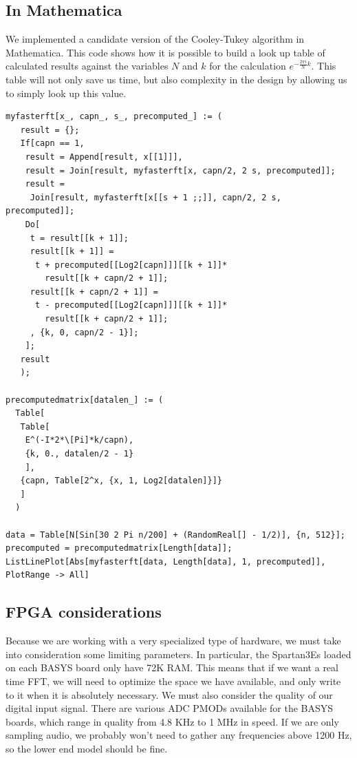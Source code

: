 \documentclass[12pt]{article}
\begin{document}
  \subsection*{In Mathematica}
  We implemented a candidate version of the Cooley-Tukey algorithm in Mathematica. This code shows how it is possible to build a look up table of calculated results against the variables $N$ and $k$ for the calculation $e^{-\frac{2\pi i}{N} k}$. This table will not only save us time, but also complexity in the design by allowing us to simply look up this value.
  \begin{lstlisting}
myfasterft[x_, capn_, s_, precomputed_] := (
   result = {};
   If[capn == 1,
    result = Append[result, x[[1]]],
    result = Join[result, myfasterft[x, capn/2, 2 s, precomputed]];
    result = 
     Join[result, myfasterft[x[[s + 1 ;;]], capn/2, 2 s, precomputed]];
    Do[
     t = result[[k + 1]];
     result[[k + 1]] = 
      t + precomputed[[Log2[capn]]][[k + 1]]*
        result[[k + capn/2 + 1]];
     result[[k + capn/2 + 1]] = 
      t - precomputed[[Log2[capn]]][[k + 1]]*
        result[[k + capn/2 + 1]];
     , {k, 0, capn/2 - 1}];
    ];
   result
   );

precomputedmatrix[datalen_] := (
  Table[
   Table[
    E^(-I*2*\[Pi]*k/capn),
    {k, 0., datalen/2 - 1}
    ],
   {capn, Table[2^x, {x, 1, Log2[datalen]}]}
   ]
  )

data = Table[N[Sin[30 2 Pi n/200] + (RandomReal[] - 1/2)], {n, 512}];
precomputed = precomputedmatrix[Length[data]];
ListLinePlot[Abs[myfasterft[data, Length[data], 1, precomputed]], PlotRange -> All]
  \end{lstlisting}
  \subsection*{FPGA considerations}
    Because we are working with a very specialized type of hardware, we must take into consideration some limiting parameters.
    In particular, the Spartan3Es loaded on each BASYS board only have 72K RAM.
    This means that if we want a real time FFT, we will need to optimize the space we have available, and only write to it when it is absolutely necessary.
    We must also consider the quality of our digital input signal.
    There are various ADC PMODs available for the BASYS boards, which range in quality from 4.8 KHz to 1 MHz in speed.
    If we are only sampling audio, we probably won't need to gather any frequencies above 1200 Hz, so the lower end model should be fine.\\
\end{document}
